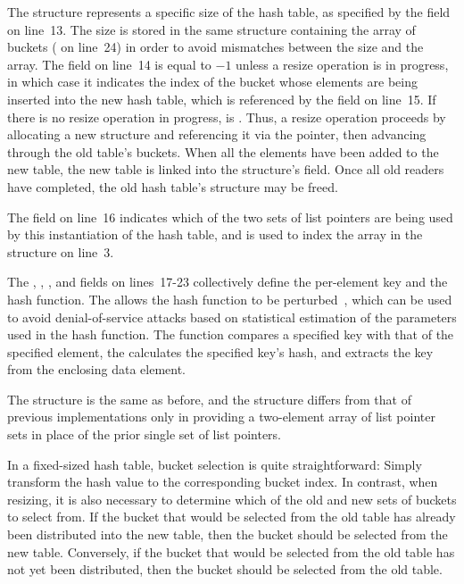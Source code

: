 The  structure represents a specific size of the hash table,
as specified by the  field on line~13.
The size is stored in the same structure containing the array of
buckets ( on line~24) in order to avoid mismatches between
the size and the array.
The  field on line~14 is equal to $-1$ unless a resize
operation
is in progress, in which case it indicates the index of the bucket whose
elements are being inserted into the new hash table, which is referenced
by the  field on line~15.
If there is no resize operation in progress,  is .
Thus, a resize operation proceeds by allocating a new  structure
and referencing it via the  pointer, then advancing
 through the old table's buckets.
When all the elements have been added to the new table, the new
table is linked into the  structure's  field.
Once all old readers have completed, the old hash table's  structure
may be freed.

The  field on line~16 indicates which of the two sets of
list pointers are being used by this instantiation of the hash table,
and is used to index the  array in the 
structure on line~3.

The , , ,
and  fields on lines~17-23
collectively define the per-element key and the hash function.
The  allows the hash function to be
perturbed~\cite{McKenney89c,McKenney90,McKenney91}, which can be
used to avoid denial-of-service attacks based on statistical
estimation of the parameters used in the hash function.
The  function compares a specified key with that of
the specified element,
the  calculates the specified key's hash,
and  extracts the key from the enclosing data
element.

The  structure is the same as before, and the
 structure differs from that of previous implementations
only in providing a two-element array of list pointer sets in place of
the prior single set of list pointers.

In a fixed-sized hash table, bucket selection is quite straightforward:
Simply transform the hash value to the corresponding bucket index.
In contrast, when resizing, it is also necessary to determine which
of the old and new sets of buckets to select from.
If the bucket that would be selected from the old table has already
been distributed into the new table, then the bucket should be selected
from the new table.
Conversely, if the bucket that would be selected from the old table
has not yet been distributed, then the bucket should be selected from
the old table.

